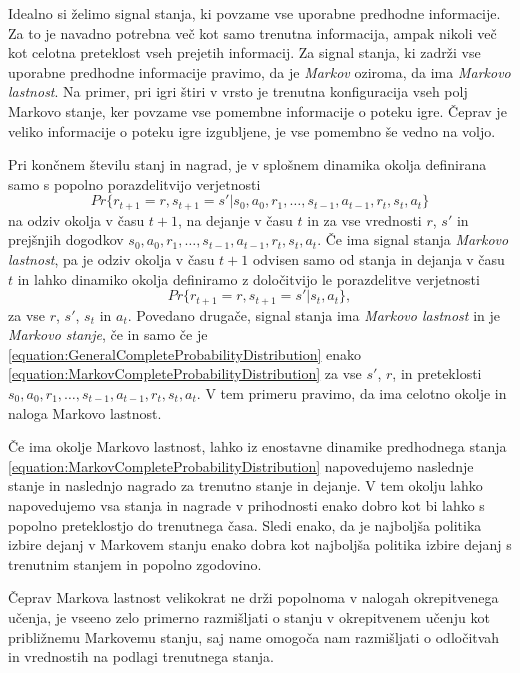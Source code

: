 \documentclass[a4paper, oneside, 12pt]{report}
\begin{document}
Idealno si želimo signal stanja, ki povzame vse uporabne predhodne informacije. Za to je navadno potrebna več kot samo trenutna informacija, ampak nikoli več kot celotna preteklost vseh prejetih informacij. Za signal stanja, ki zadrži vse uporabne predhodne informacije pravimo, da je {\em Markov} oziroma, da ima {\em Markovo lastnost}. Na primer, pri igri štiri v vrsto je trenutna konfiguracija vseh polj Markovo stanje, ker povzame vse pomembne informacije o poteku igre. Čeprav je veliko informacije o poteku igre izgubljene, je vse pomembno še vedno na voljo.

Pri končnem številu stanj in nagrad, je v splošnem dinamika okolja definirana samo s popolno porazdelitvijo verjetnosti
\begin{equation} \label{equation:GeneralCompleteProbabilityDistribution}
Pr\{r_{t+1} = r, s_{t+1} = s' | s_0, a_0, r_1, \dots, s_{t-1}, a_{t-1}, r_t, s_t, a_t\}
\end{equation}
na odziv okolja v času $t+1$, na dejanje v času $t$ in za vse vrednosti $r$, $s'$ in prejšnjih dogodkov $s_0, a_0, r_1, \dots, s_{t-1}, a_{t-1}, r_t, s_t, a_t$. Če ima signal stanja {\em Markovo lastnost}, pa je odziv okolja v času $t+1$ odvisen samo od stanja in dejanja v času $t$ in lahko dinamiko okolja definiramo z določitvijo le porazdelitve verjetnosti
\begin{equation} \label{equation:MarkovCompleteProbabilityDistribution}
Pr\{r_{t+1} = r, s_{t+1} = s' | s_t, a_t\},
\end{equation}
za vse $r$, $s'$, $s_t$ in $a_t$. Povedano drugače, signal stanja ima {\em Markovo lastnost} in je {\em Markovo stanje}, če in samo če je \eqref{equation:GeneralCompleteProbabilityDistribution} enako \eqref{equation:MarkovCompleteProbabilityDistribution} za vse $s'$, $r$, in preteklosti $s_0, a_0, r_1, \dots, s_{t-1}, a_{t-1}, r_t, s_t, a_t$. V tem primeru pravimo, da ima celotno okolje in naloga Markovo lastnost.

Če ima okolje Markovo lastnost, lahko iz enostavne dinamike predhodnega stanja \eqref{equation:MarkovCompleteProbabilityDistribution} napovedujemo naslednje stanje in naslednjo nagrado za trenutno stanje in dejanje. V tem okolju lahko napovedujemo vsa stanja in nagrade v prihodnosti enako dobro kot bi lahko s popolno preteklostjo do trenutnega časa. Sledi enako, da je najboljša politika izbire dejanj v Markovem stanju enako dobra kot najboljša politika izbire dejanj s trenutnim stanjem in popolno zgodovino.

Čeprav Markova lastnost velikokrat ne drži popolnoma v nalogah okrepitvenega učenja, je vseeno zelo primerno razmišljati o stanju v okrepitvenem učenju kot približnemu Markovemu stanju, saj name omogoča nam razmišljati o odločitvah in vrednostih na podlagi trenutnega stanja.
\end{document}
